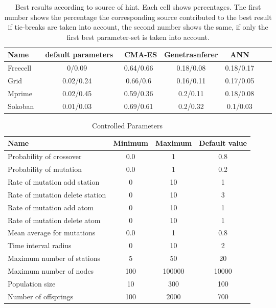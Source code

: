 \documentclass{acm_proc_article-sp}
\begin{document}
 \begin{table*}[ht]
\centering
\begin{tabular}{l c c c c c c}
\hline\hline
Name & \ default parameters & \ CMA-ES &  Genetrasnferer & ANN \\ 
\hline
Freecell & 0/0.09& 0.64/0.66  & 0.18/0.08  & 0.18/0.17     \\
Grid & 0.02/0.24 & 0.66/0.6  & 0.16/0.11 & 0.17/0.05  &    \\
Mprime &  0.02/0.45& 0.59/0.36 & 0.2/0.11  & 0.18/0.08  &    \\
Sokoban & 0.01/0.03 & 0.69/0.61   & 0.2/0.32  & 0.1/0.03  &    \\
\hline
\end{tabular}
\caption{Best results according to source of hint. Each cell shows percentages. The first number shows the percentage the corresponding source contributed to the best result if tie-breaks are taken into account, the second number shows the same, if only the first best parameter-set is taken into account.}
\label{table:hints}
\end{table*} 



\begin{table*}[ht]
\centering
\begin{tabular}{l c c c}
\hline\hline
Name & Minimum & Maximum & Default value \\ 
\hline
Probability of crossover & 0.0 & 1 & 0.8 \\
Probability of mutation & 0.0& 1& 0.2 \\
Rate of mutation add station& 0& 10& 1 \\
Rate of mutation delete station& 0& 10& 3 \\
Rate of mutation add atom& 0& 10& 1 \\
Rate of mutation delete atom& 0& 10& 1 \\
Mean average for mutations& 0.0& 1& 0.8 \\
Time interval radius& 0& 10& 2 \\
Maximum number of stations& 5& 50& 20 \\
Maximum number of nodes& 100& 100000& 10000 \\
Population size& 10& 300& 100 \\
Number of offsprings& 100& 2000& 700 \\
\hline
\end{tabular}
\caption{Controlled Parameters}
\label{table:parameters}
\end{table*} 
\end{document}
